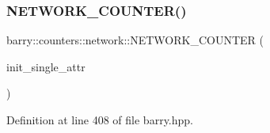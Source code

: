\subsubsection{\texorpdfstring{N\+E\+T\+W\+O\+R\+K\+\_\+\+C\+O\+U\+N\+T\+E\+R()}{NETWORK\_COUNTER()}}
{\footnotesize\ttfamily barry\+::counters\+::network\+::\+N\+E\+T\+W\+O\+R\+K\+\_\+\+C\+O\+U\+N\+T\+ER (\begin{DoxyParamCaption}\item[{init\+\_\+single\+\_\+attr}]{ }\end{DoxyParamCaption})}



Definition at line 408 of file barry.\+hpp.

